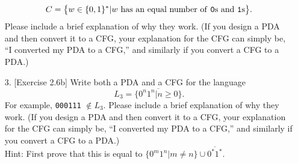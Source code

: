 \documentclass{article}
\newcommand{\str}{\texttt}
\newcommand{\newp}{\\[2mm]}
\begin{document}
\begin{enumerate}
    \[
    C = \big\{w \in \{0, 1\}^* | w\text{ has an equal number of \str{0}s and \str{1}s}\big\}.
    \]
    Please include a brief explanation of why they work. (If you design a PDA and then convert it to a CFG, your explanation for the CFG can simply be, ``I converted my PDA to a CFG,'' and similarly if you convert a CFG to a PDA.)\newp
    
\newpage
    \item [3.] [Exercise 2.6b] Write both a PDA and a CFG for the language
    \[
    L_3 = \overline{\{0^n1^n | n \geq 0\}}.
    \]
    For example, \str{000111} $\notin L_3$. Please include a brief explanation of why they work. (If you design a PDA and then convert it to a CFG, your explanation for the CFG can simply be, ``I converted my PDA to a CFG,'' and similarly if you convert a CFG to a PDA.)\newp
    Hint: First prove that this is equal to $\{0^m1^n| m \neq n\} \cup \overline{0^*1^*}$.\newp
    
\end{enumerate}
\end{document}
